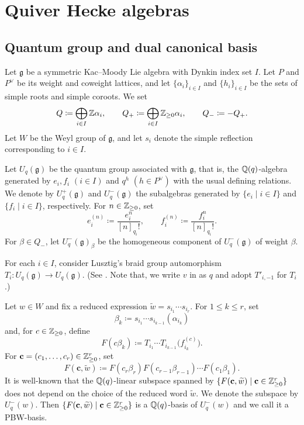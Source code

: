 \section{Quiver Hecke algebras}
\label{Sec : klr}

\subsection{Quantum group and dual canonical basis}
\label{ssec : quantum group and dual canonical basis}

Let $\mathfrak{g}$ be a symmetric Kac--Moody Lie algebra
with Dynkin index set $I$.
Let $P$ and $P^\vee$ be its weight and coweight lattices,
and let $\{\alpha_i\}_{i \in I}$ and $\{h_i\}_{i \in I}$
be the sets of simple roots and simple coroots.
We set
\[
Q \coloneq \bigoplus_{i \in I}\mathbb{Z}\alpha_i, \qquad
Q_+ \coloneq \bigoplus_{i \in I}\mathbb{Z}_{\geq 0}\alpha_i, \qquad
Q_- \coloneq -Q_+.
\]
Let $W$ be the Weyl group of $\mathfrak{g}$,
and let $s_i$ denote the simple reflection corresponding to $i \in I$.

Let $U_q(\mathfrak{g})$ be the quantum group associated with
$\mathfrak{g}$, that is, the $\mathbb{Q}(q)$-algebra generated by
$e_i, f_i$ $(i \in I)$ and $q^h$ $(h \in P^\vee)$
with the usual defining relations.
We denote by $U_q^+(\mathfrak{g})$ and $U_q^-(\mathfrak{g})$
the subalgebras generated by $\{e_i \mid i \in I\}$
and $\{f_i \mid i \in I\}$, respectively.
For $n \in \mathbb{Z}_{\geq 0}$, set
\[
e_i^{(n)} \coloneq \frac{e_i^n}{[n]_{q_i}!}, \qquad
f_i^{(n)} \coloneq \frac{f_i^n}{[n]_{q_i}!}.
\]
For $\beta \in Q_-$, let $U_q^-(\mathfrak{g})_\beta$
be the homogeneous component of $U_q^-(\mathfrak{g})$
of weight $\beta$.

For each $i \in I$, consider Lusztig's braid group automorphism
$T_i : U_q(\mathfrak{g}) \to U_q(\mathfrak{g})$.
(See \cite{Lusbook}.
Note that, we write $v$ in \cite{Lusbook} as $q$
and adopt $T'_{i, -1}$ for $T_i$.)

Let $w \in W$ and fix a reduced expression
$\widetilde{w} = s_{i_1}\cdots s_{i_r}$.
For $1 \leq k \leq r$, set
\[
\beta_k \coloneq s_{i_1}\cdots s_{i_{k - 1}}(\alpha_{i_k})
\]
and, for $c \in \mathbb{Z}_{\geq 0}$, define
\[
F(c\beta_k) \coloneq T_{i_1}\cdots T_{i_{k - 1}}
\bigl(f_{i_k}^{(c)}\bigr).
\]
For $\mathbf{c} = (c_1, \ldots, c_r) \in \mathbb{Z}_{\geq 0}^r$, set
\[
F(\mathbf{c}, \widetilde{w}) \coloneq
F(c_r\beta_r)F(c_{r - 1}\beta_{r - 1})\cdots F(c_1\beta_1).
\]
It is well-known that the $\mathbb{Q}(q)$-linear subspace spanned by
$\{F(\mathbf{c}, \widetilde{w}) \mid
\mathbf{c} \in \mathbb{Z}_{\geq 0}^r\}$
does not depend on the choice of the reduced word $\widetilde{w}$.
We denote the subspace by $U_q^-(w)$.
Then $\{F(\mathbf{c}, \widetilde{w}) \mid
\mathbf{c} \in \mathbb{Z}_{\geq 0}^r\}$
is a $\mathbb{Q}(q)$-basis of $U_q^-(w)$ and we call it a PBW-basis.

